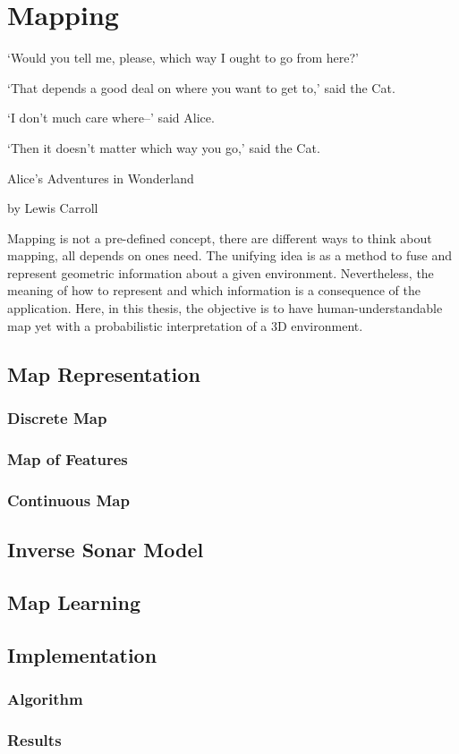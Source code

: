 
\chapter{Mapping}

\renewcommand{\epigraphsize}{\footnotesize}
\epigraph{`Would you tell me, please, which way I ought to go from here?'

  `That depends a good deal on where you want to get to,' said the Cat.

  `I don't much care where--' said Alice.

  `Then it doesn't matter which way you go,' said the Cat. }{Alice's Adventures
  in Wonderland

  by Lewis Carroll}
  
Mapping is not a pre-defined concept, there are different ways to think about
mapping, all depends on ones need. The unifying idea is as a method to fuse and
represent geometric information about a given environment. Nevertheless, the
meaning of how to represent and which information is a consequence of the
application. Here, in this thesis, the objective is to have human-understandable
map yet with a probabilistic interpretation of a 3D environment. 

\section{Map Representation}
\subsection{Discrete Map}
\subsection{Map of Features}
\subsection{Continuous Map}

\section{Inverse Sonar Model}

\section{Map Learning}

\section{Implementation}
\subsection{Algorithm}
\subsection{Results}


